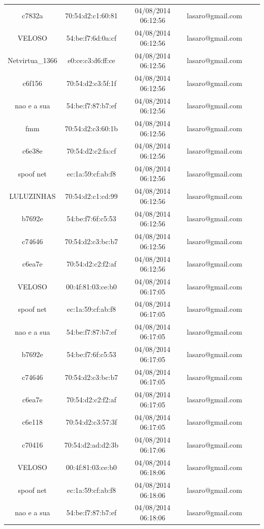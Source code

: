 \documentclass[12pt, %
openright, 
oneside,
a4paper,
brazil]{facom-ufu-abntex2}
\begin{document}
\begin{table}
\begin{longtable}{|c|c|c|c|c|c|}
c7832a & 70:54:d2:c1:60:81 & 04/08/2014 06:12:56 & lasaro@gmail.com \\
VELOSO & 54:be:f7:6d:0a:cf & 04/08/2014 06:12:56 & lasaro@gmail.com \\
Netvirtua\_1366 & e0:ce:c3:d6:ff:ce & 04/08/2014 06:12:56 & lasaro@gmail.com \\
c6f156 & 70:54:d2:c3:5f:1f & 04/08/2014 06:12:56 & lasaro@gmail.com \\
nao e a sua & 54:be:f7:87:b7:ef & 04/08/2014 06:12:56 & lasaro@gmail.com \\
fmm & 70:54:d2:c3:60:1b & 04/08/2014 06:12:56 & lasaro@gmail.com \\
c6e38e & 70:54:d2:c2:fa:cf & 04/08/2014 06:12:56 & lasaro@gmail.com \\
spoof net & ec:1a:59:cf:ab:f8 & 04/08/2014 06:12:56 & lasaro@gmail.com \\
LULUZINHAS & 70:54:d2:c1:cd:99 & 04/08/2014 06:12:56 & lasaro@gmail.com \\
b7692e & 54:be:f7:6f:c5:53 & 04/08/2014 06:12:56 & lasaro@gmail.com \\
c74646 & 70:54:d2:c3:bc:b7 & 04/08/2014 06:12:56 & lasaro@gmail.com \\
c6ea7e & 70:54:d2:c2:f2:af & 04/08/2014 06:12:56 & lasaro@gmail.com \\
VELOSO & 00:4f:81:03:ce:b0 & 04/08/2014 06:17:05 & lasaro@gmail.com \\
spoof net & ec:1a:59:cf:ab:f8 & 04/08/2014 06:17:05 & lasaro@gmail.com \\
nao e a sua & 54:be:f7:87:b7:ef & 04/08/2014 06:17:05 & lasaro@gmail.com \\
b7692e & 54:be:f7:6f:c5:53 & 04/08/2014 06:17:05 & lasaro@gmail.com \\
c74646 & 70:54:d2:c3:bc:b7 & 04/08/2014 06:17:05 & lasaro@gmail.com \\
c6ea7e & 70:54:d2:c2:f2:af & 04/08/2014 06:17:05 & lasaro@gmail.com \\
c6e118 & 70:54:d2:c3:57:3f & 04/08/2014 06:17:05 & lasaro@gmail.com \\
c70416 & 70:54:d2:ad:d2:3b & 04/08/2014 06:17:06 & lasaro@gmail.com \\
VELOSO & 00:4f:81:03:ce:b0 & 04/08/2014 06:18:06 & lasaro@gmail.com \\
spoof net & ec:1a:59:cf:ab:f8 & 04/08/2014 06:18:06 & lasaro@gmail.com \\
nao e a sua & 54:be:f7:87:b7:ef & 04/08/2014 06:18:06 & lasaro@gmail.com \\
\end{longtable}
\end{table}
\end{document}
